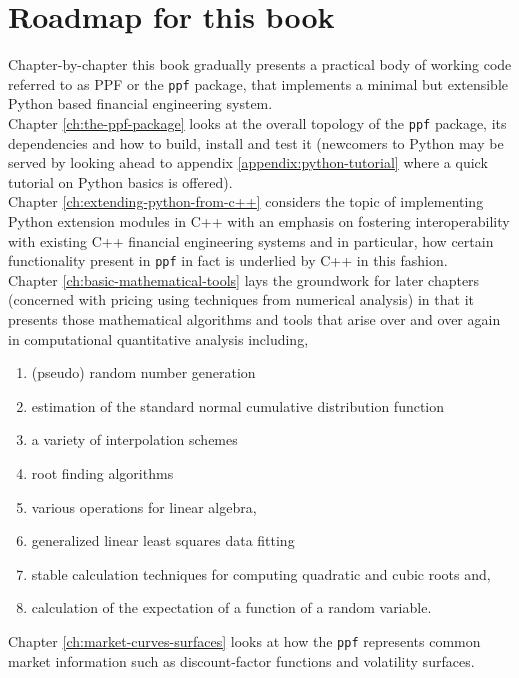 \section{Roadmap for this book}

Chapter-by-chapter this book gradually presents a practical body of
working code referred to as PPF or the \verb|ppf| package, that
implements a minimal but extensible Python based financial engineering
system.\\

Chapter \ref{ch:the-ppf-package} looks at the overall topology of the
\verb|ppf| package, its dependencies and how to build, install and
test it (newcomers to Python may be served by looking ahead to
appendix \ref{appendix:python-tutorial} where a quick tutorial on
Python basics is offered).\\

Chapter \ref{ch:extending-python-from-c++} considers the topic of
implementing Python extension modules in C++ with an emphasis on
fostering interoperability with existing C++ financial engineering
systems and in particular, how certain functionality present in
\verb|ppf| in fact is underlied by C++ in this fashion.\\

Chapter \ref{ch:basic-mathematical-tools} lays the groundwork for
later chapters (concerned with pricing using techniques from numerical
analysis) in that it presents those mathematical algorithms and tools
that arise over and over again in computational quantitative
analysis including,
\begin{enumerate}
  \item{(pseudo) random number generation}
  \item{estimation of the standard normal cumulative distribution function}
  \item{a variety of interpolation schemes}
  \item{root finding algorithms}
  \item{various operations for linear algebra},
  \item{generalized linear least squares data fitting}
  \item{stable calculation techniques for computing quadratic and cubic roots} and,
  \item{calculation of the expectation of a function of a random variable.}
\end{enumerate}

Chapter \ref{ch:market-curves-surfaces} looks at how the \verb|ppf|
represents common market information such as discount-factor functions
and volatility surfaces.\\

